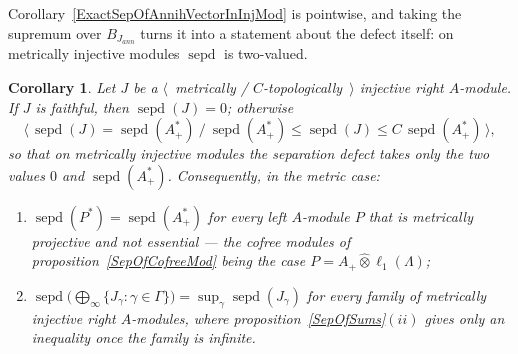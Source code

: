 \documentclass[11pt]{article}
\theoremstyle{plain}
\newtheorem{corollary}[theorem]{Corollary}
\theoremstyle{definition}
\newcommand{\projtens}{\mathbin{\widehat{\otimes}}}
\DeclareMathOperator{\sepd}{sepd}
\begin{document}
Corollary~\ref{ExactSepOfAnnihVectorInInjMod} is pointwise, and taking the
supremum over $B_{J_{ann}}$ turns it into a statement about the defect itself: on
metrically injective modules $\sepd$ is two-valued.

\begin{corollary}\label{SepOfInjMod}
Let $J$ be a $\langle$~metrically / $C$-topologically~$\rangle$ injective right
$A$-module. If $J$ is faithful, then $\sepd(J)=0$; otherwise
\[
\langle\,\sepd(J)=\sepd(A_+^*)\ /\
\sepd(A_+^*)\leq\sepd(J)\leq C\,\sepd(A_+^*)\,\rangle ,
\]
so that on metrically injective modules the separation defect takes only the two
values $0$ and $\sepd(A_+^*)$. Consequently, in the metric case:
\begin{enumerate}[label = (\roman*)]
\item $\sepd(P^*)=\sepd(A_+^*)$ for every left $A$-module $P$ that is metrically
projective and not essential --- the cofree modules of
proposition~\ref{SepOfCofreeMod} being the case
$P=A_+\projtens\ell_1(\Lambda)$;

\item $\sepd \bigl(\bigoplus_\infty \{J_\gamma:\gamma\in\Gamma \} \bigr)
=\sup_\gamma\sepd(J_\gamma)$ for every family of metrically injective right
$A$-modules, where proposition~\ref{SepOfSums}$(ii)$ gives only an inequality
once the family is infinite.
\end{enumerate}
\end{corollary}
\end{document}
